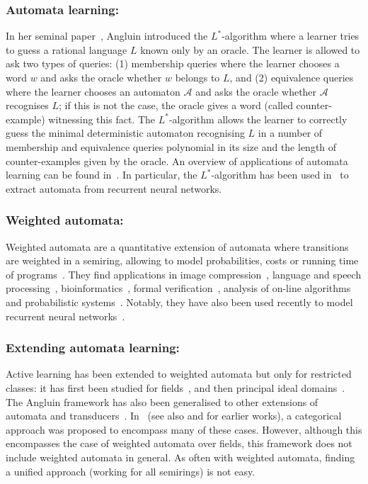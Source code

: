 \documentclass{lmcs}
\numberwithin{theorem}{section}
\begin{document}
\subsubsection*{\textbf{Automata learning:}} In her seminal paper~\cite{A87}, Angluin introduced the $L^*$-algorithm where a learner tries to guess a rational language $L$ known only by an oracle. The learner is allowed to ask two types of queries: (1) membership queries where the learner chooses a word $w$ and asks the oracle whether $w$ belongs to $L$, and (2) equivalence queries where the learner chooses an automaton $\mathcal{A}$ and asks the oracle whether $\mathcal{A}$ recognises $L$; if this is not the case, the oracle gives a word (called counter-example) witnessing this fact. The $L^*$-algorithm allows the learner to correctly guess  the minimal deterministic automaton recognising $L$ in a  number of membership and equivalence queries polynomial in its size and the length of counter-examples given by the oracle. An overview of applications of automata learning can be found in~\cite{L06,HS16,V17}. In particular, the $L^*$-algorithm has been used in~\cite{WGY18} to extract automata from recurrent neural networks.

\subsubsection*{\textbf{Weighted automata:}} Weighted automata are a quantitative extension of automata where transitions are weighted in a semiring, allowing to model probabilities, costs or running time of programs~\cite{Schutzenberger1961,Droste2009,DrosteK21}. They find applications in image compression~\cite{CK93,Culik1997}, language and speech processing~\cite{Mohri1997,MPR05}, bioinformatics~\cite{AMT08}, formal verification~\cite{Chatterjee2010,AKL11}, analysis of on-line algorithms \cite{Aminof2010} and probabilistic systems~\cite{Vardi85}. Notably, they have also been used recently to model recurrent neural networks~\cite{RLP19,OWSH20,ZDXML021,WZS22}.

\subsubsection*{\textbf{Extending automata learning:}} Active learning has been extended to weighted automata but only for restricted classes: it has first been studied for fields~\cite{BV96,BM15}, and then principal ideal domains~\cite{HKRS20}. The Angluin framework has also been generalised to other extensions of automata and transducers~\cite{V96,V00,BHKL09,BLN12,AF14,AEF15,BLN16,DD17,MSSKS17,HS020}. In~\cite{CPS21} (see also \cite{HSS17} \cite{BKR19} and \cite{US2020} for earlier works), a categorical approach was proposed to encompass many of these cases. However, although this encompasses the case of weighted automata over fields, this framework does not include weighted automata in general. As often with weighted automata, finding a unified approach (working for all semirings) is not easy.
\end{document}
